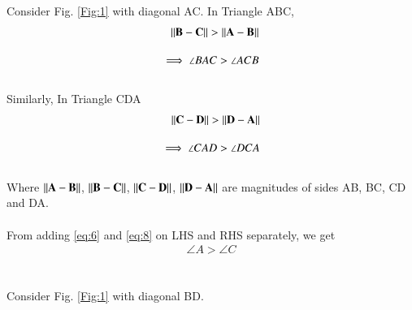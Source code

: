 \documentclass[journal,12pt,twocolumn]{IEEEtran}
\begin{document}
Consider Fig. \ref{Fig:1} with diagonal AC.
In Triangle ABC,
\begin{align}
\lVert\mathbf{B-C}\rVert > \lVert\mathbf{A-B}\rVert\\[1em]
\implies \angle BAC > \angle ACB \label{eq:6}
\end{align}\\
Similarly, In Triangle CDA
\begin{align}
\lVert\mathbf{C-D}\rVert > \lVert\mathbf{D-A}\rVert\\[1em]
\implies \angle CAD > \angle DCA \label{eq:8}
\end{align}\\
Where $\lVert\mathbf{A-B}\rVert$, $\lVert\mathbf{B-C}\rVert$, $\lVert\mathbf{C-D}\rVert$, $\lVert\mathbf{D-A}\rVert$  are magnitudes of sides AB, BC, CD and DA.\\\\
From adding \eqref{eq:6} and \eqref{eq:8} on LHS and RHS separately, we get
\begin{align}
    \angle A > \angle C \label{eq:9}
\end{align}
\\\\
Consider Fig. \ref{Fig:1} with diagonal BD.
\end{document}
